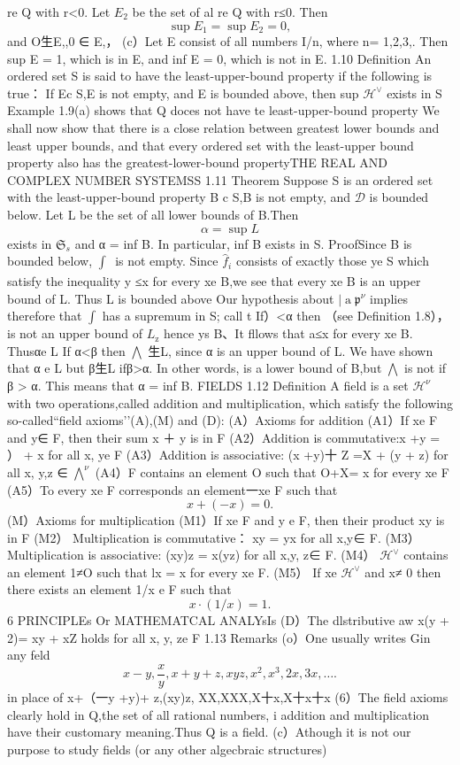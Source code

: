 re Q with r<0. Let $E_{2}$ be the set of al re Q with r≤0. Then $$ \operatorname*{sup}E_{1}=\operatorname*{sup}E_{2}=0, $$ and O生E,,0 ∈ E,， (c）Let E consist of all numbers I/n, where n= 1,2,3,. Then sup E = 1, which is in E, and inf E = 0, which is not in E. 1.10 Definition An ordered set S is said to have the least-upper-bound property if the following is true： If Ec S,E is not empty, and E is bounded above, then sup ${\mathcal{H}}^{\vee}$ exists in S Example 1.9(a) shows that Q doces not have te least-upper-bound property We shall now show that there is a close relation between greatest lower bounds and least upper bounds, and that every ordered set with the least-upper bound property also has the greatest-lower-bound propertyTHE REAL AND COMPLEX NUMBER SYSTEMSS 1.11 Theorem Suppose S is an ordered set with the least-upper-bound property B c S,B is not empty, and ${\mathcal{D}}$ is bounded below. Let L be the set of all lower bounds of B.Then $$ \alpha=\operatorname*{sup}L $$ exists in ${\mathfrak{S}}_{s}$ and α = inf B. In particular, inf B exists in S. ProofSince B is bounded below, $\textstyle\int_{}^{}{\frac{}{}}$ is not empty. Since ${\widehat{f}}_{i}$ consists of exactly those ye S which satisfy the inequality y ≤x for every xe B,we see that every xe B is an upper bound of L. Thus L is bounded above Our hypothesis about $|\operatorname{a}{\mathfrak{p}}^{\nu}$ implies therefore that $\textstyle{\int}$ has a supremum in S; call t If）<α then （see Definition 1.8），is not an upper bound of $\textstyle{L_{\mathrm{z}}}$ hence ys B、It fllows that a≤x for every xe B. Thusαe L If α<β then $\textstyle\bigwedge$ 生L, since α is an upper bound of L. We have shown that α e L but β生L ifβ>α. In other words, is a lower bound of B,but $\textstyle\bigwedge$ is not if β > α. This means that α = inf B. FIELDS 1.12 Definition A field is a set ${\mathcal{H}}^{\nu}$ with two operations,called addition and multiplication, which satisfy the following so-called“field axioms'’(A),(M) and (D): (A）Axioms for addition (A1）If xe F and y∈ F, then their sum x ＋ y is in F (A2）Addition is commutative:x +y = ） + x for all x, ye F (A3）Addition is associative: (x +y)十 Z =X + (y + z) for all x, y,z ∈ ${\textstyle\bigwedge}^{\nu}$ (A4）F contains an element O such that O+X= x for every xe F (A5）To every xe F corresponds an element一xe F such that $$ x+(-x)=0. $$ (M）Axioms for multiplication (M1）If xe F and y e F, then their product xy is in F (M2） Multiplication is commutative： xy = yx for all x,y∈ F. (M3） Multiplication is associative: (xy)z = x(yz) for all x,y, z∈ F. (M4） ${\mathcal{H}}^{\vee}$ contains an element 1≠O such that lx = x for every xe F. (M5） If xe ${\mathcal{H}}^{\vee}$ and x≠ 0 then there exists an element 1/x e F such that $$ x\cdot(1/x)=1. $$6 PRINCIPLEs Or MATHEMATCAL ANALYsIs (D）The dlstributive aw x(y + 2)= xy + xZ holds for all x, y, ze F 1.13 Remarks (o）One usually writes Gin any feld $$ x-y,{\frac{x}{y}},x+y+z,x y z,x^{2},x^{3},2x,3x,\dots. $$ in place of x+（一y +y)+ z,(xy)z, XX,XXX,X十x,X十x十x (6）The field axioms clearly hold in Q,the set of all rational numbers, i addition and multiplication have their customary meaning.Thus Q is a field. (c）Athough it is not our purpose to study fields (or any other algecbraic structures) 